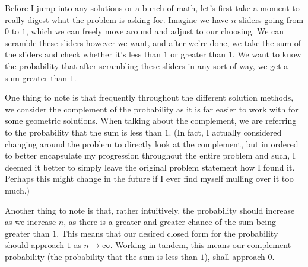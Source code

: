 


Before I jump into any solutions or a bunch of math, let's first take a moment
to really digest what the problem is asking for. Imagine we have \( n \)
sliders going from \( 0 \) to \( 1 \), \MarginComment{} which we can freely move around and
adjust to our choosing. We can scramble these sliders however we want, and
after we're done, we take the sum of the sliders and check whether it's less
than \( 1 \) or greater than \( 1 \). We want to know the probability that
after scrambling these sliders in any sort of way, we get a sum greater than \(
1 \).

One thing to note is that frequently throughout the different solution methods,
we consider the complement of the probability as it is far easier to work with
for some geometric solutions. When talking about the complement, we are
referring to the probability that the sum is less than \( 1 \). (In fact, I actually considered changing around the problem to directly look at the complement, but in ordered to better encapsulate my progression throughout the entire problem and such, I deemed it better to simply leave the original problem statement how I found it. Perhaps this might change in the future if I ever find myself mulling over it too much.)

Another thing to note is that, rather intuitively, the probability should
increase as we increase \( n \), as there is a greater and greater chance of
the sum being greater than \( 1 \). This means that our desired closed form for
the probability should approach \( 1 \) as \( n \to \infty \). Working in
tandem, this means our complement probability (the probability that the sum is
less than \( 1 \)), shall approach \( 0 \).


